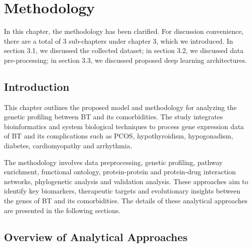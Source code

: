 %
%
\let\textcircled=\pgftextcircled
\chapter{Methodology}
\label{chap:methodology}
In this chapter, the methodology has been clarified. For discussion convenience, there are a total of 3 sub-chapters under chapter 3, which we introduced. In section 3.1, we discussed the collected dataset; in section 3.2, we discussed data pre-processing; in section 3.3, we discussed proposed deep learning architectures.

\vspace{150mm}

\section{Introduction}
\label{sec:sec3_1}
This chapter outlines the proposed model and methodology for analyzing the genetic profiling between BT and its comorbidities. The study integrates bioinformatics and system biological techniques to process gene expression data of BT and its complications such as PCOS, hypothyroidism, hypogonadism, diabetes, cardiomyopathy and arrhythmia.

The methodology involves data preprocessing, genetic profiling, pathway enrichment, functional ontology, protein-protein and protein-drug interaction networks, phylogenetic analysis and validation analysis. These approaches aim to identify key biomarkers, therapeutic targets and evolutionary insights between the genes of BT and its comorbidities. The details of these analytical approaches are presented in the following sections.

\section{Overview of Analytical Approaches}
\label{sec:sec3_3}


